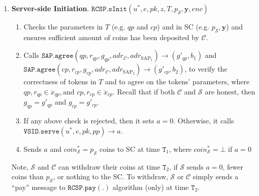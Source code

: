 \begin{enumerate}
\begin{enumerate}

\end{enumerate}

\
\item \textbf{Server-side Initiation}\label{RCSP::Server-side-Initiation}. $\mathtt{RCSP}.\mathtt{sInit}(u^{\scriptscriptstyle *}, e, pk, z, T, p_{\scriptscriptstyle\mathcal{S}} ,\bm{y},enc)$

\begin{enumerate}

\item Checks the parameters  in $T$ (e.g. $qp$ and $cp$) and  in SC (e.g. $p_{\scriptscriptstyle\mathcal{S}}, \bm{y}$) and ensures sufficient amount of coins has been deposited by $\mathcal C$.  

\item Calls $\mathtt{SAP.agree}(qp,r_{\scriptscriptstyle qp},g_{\scriptscriptstyle qp},adr_{\scriptscriptstyle\mathcal{C}},adr_{\scriptscriptstyle\text{SAP}_{1}})\rightarrow (g'_{\scriptscriptstyle qp},b_{\scriptscriptstyle 1})$ and $\mathtt{SAP.agree}(cp,r_{\scriptscriptstyle cp},g_{\scriptscriptstyle cp},adr_{\scriptscriptstyle\mathcal{C}},adr_{\scriptscriptstyle\text{SAP}_{2}})\rightarrow (g'_{\scriptscriptstyle cp},b_{\scriptscriptstyle 2})$, to verify the correctness of tokens in $T$ and to agree on the tokens' parameters, where $qp,r_{\scriptscriptstyle qp}\in \ddot{x}_{\scriptscriptstyle qp}, \text{and }  cp,r_{\scriptscriptstyle cp} \in  \ddot{x}_{\scriptscriptstyle cp}$. Recall that if both $\mathcal{C}$ and $\mathcal{S}$ are honest, then $g_{\scriptscriptstyle qp}=g'_{\scriptscriptstyle qp}$ and $g_{\scriptscriptstyle cp}=g'_{\scriptscriptstyle cp}$. 




\item If any above check is rejected, then it sets $a=0$. Otherwise, it  calls $\mathtt{VSID.serve}(u^{\scriptscriptstyle *},e,pk, {pp})\rightarrow a$. 

\item Sends $a$ and $coin^{\scriptscriptstyle *}_{\scriptscriptstyle\mathcal S}=p_{\scriptscriptstyle\mathcal{S}}$ coins to SC at time $\texttt{T}_{\scriptscriptstyle 1}$, where  $coin^{\scriptscriptstyle *}_{\scriptscriptstyle\mathcal S}=\bot$ if $a=0$
\end{enumerate}
Note, $\mathcal S$  and  $\mathcal C$ can withdraw their coins at time $\texttt{T}_{\scriptscriptstyle 2}$, if  $\mathcal S$ sends $a=0$, fewer coins than $p_{\scriptscriptstyle\mathcal{S}}$, or nothing to the SC. To withdraw, $\mathcal S$  or  $\mathcal C$  simply sends a ``pay'' message to $\mathtt{RCSP}.\mathtt{pay}(.)$ algorithm (only) at time $\texttt{T}_{\scriptscriptstyle 2}$.


\end{enumerate}
